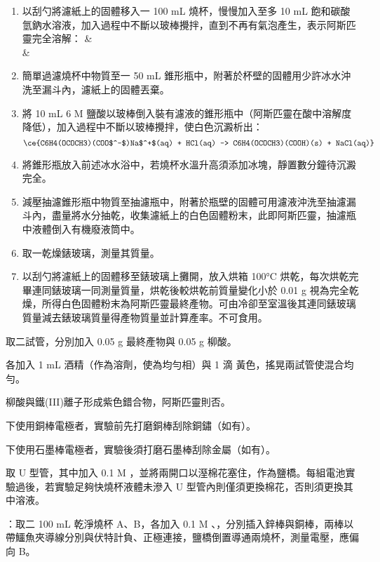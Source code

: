 \documentclass[a4paper,12pt]{article}
\begin{document}
\begin{enumerate}
\item 以刮勺將濾紙上的固體移入一 100 mL 燒杯，慢慢加入至多 10 mL 飽和碳酸氫鈉水溶液，加入過程中不斷以玻棒攪拌，直到不再有氣泡產生，表示阿斯匹靈完全溶解：
\bma
& \\
\tx{\ce{->}} & 
\eam
\item 簡單過濾燒杯中物質至一 50 mL 錐形瓶中，附著於杯壁的固體用少許冰水沖洗至漏斗內，濾紙上的固體丟棄。
\item 將 10 mL 6 M 鹽酸以玻棒倒入裝有濾液的錐形瓶中（阿斯匹靈在酸中溶解度降低），加入過程中不斷以玻棒攪拌，使白色沉澱析出：
\[\ce{C6H4(OCOCH3)(COO$^-$)Na$^+$(aq) + HCl(aq) -> C6H4(OCOCH3)(COOH)(s) + NaCl(aq)}\]
\item 將錐形瓶放入前述冰水浴中，若燒杯水溫升高須添加冰塊，靜置數分鐘待沉澱完全。
\item 減壓抽濾錐形瓶中物質至抽濾瓶中，附著於瓶壁的固體可用濾液沖洗至抽濾漏斗內，盡量將水分抽乾，收集濾紙上的白色固體粉末，此即阿斯匹靈，抽濾瓶中液體倒入有機廢液筒中。
\item 取一乾燥錶玻璃，測量其質量。
\item 以刮勺將濾紙上的固體移至錶玻璃上攤開，放入烘箱 100°C 烘乾，每次烘乾完畢連同錶玻璃一同測量質量，烘乾後較烘乾前質量變化小於 0.01 g 視為完全乾燥，所得白色固體粉末為阿斯匹靈最終產物。可由冷卻至室溫後其連同錶玻璃質量減去錶玻璃質量得產物質量並計算產率。不可食用。
\end{enumerate}
\ben
\item 取二試管，分別加入 0.05 g 最終產物與 0.05 g 柳酸。
\item 各加入 1 mL 酒精（作為溶劑，使為均勻相）與 1 滴 黃色，搖晃兩試管使混合均勻。
\item 柳酸與鐵(III)離子形成紫色錯合物，阿斯匹靈則否。
\een
{}
\ben
\item 下使用銅棒電極者，實驗前先打磨銅棒刮除銅鏽（如有）。
\item 下使用石墨棒電極者，實驗後須打磨石墨棒刮除金屬（如有）。
\item 取 U 型管，其中加入 0.1 M  ，並將兩開口以溼棉花塞住，作為鹽橋。每組電池實驗過後，若實驗足夠快燒杯液體未滲入 U 型管內則僅須更換棉花，否則須更換其中溶液。
\item {}：取二 100 mL 乾淨燒杯 A、B，各加入 0.1 M 、，分別插入鋅棒與銅棒，兩棒以帶鱷魚夾導線分別與伏特計負、正極連接，鹽橋倒置導通兩燒杯，測量電壓，應偏向 B。
\end{document}
